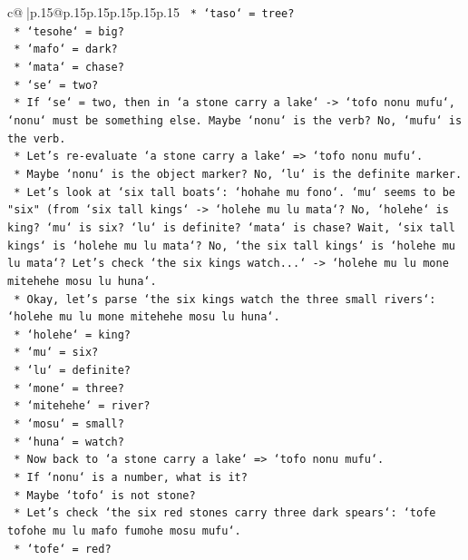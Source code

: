 \documentclass{article}
\begin{document}
{\begin{supertabular}{c@{$\;$}|p{.15\linewidth}@{}p{.15\linewidth}p{.15\linewidth}p{.15\linewidth}p{.15\linewidth}p{.15\linewidth}}
{{{\texttt{        *   `taso` = tree?} \\
\texttt{        *   `tesohe` = big?} \\
\texttt{        *   `mafo` = dark?} \\
\texttt{        *   `mata` = chase?} \\
\texttt{        *   `se` = two?} \\
\texttt{        *   If `se` = two, then in `a stone carry a lake` {-}> `tofo nonu mufu`, `nonu` must be something else. Maybe `nonu` is the verb? No, `mufu` is the verb.} \\
\texttt{        *   Let's re{-}evaluate `a stone carry a lake` => `tofo nonu mufu`.} \\
\texttt{        *   Maybe `nonu` is the object marker? No, `lu` is the definite marker.} \\
\texttt{        *   Let's look at `six tall boats`: `hohahe mu fono`. `mu` seems to be "six" (from `six tall kings` {-}> `holehe mu lu mata`? No, `holehe` is king? `mu` is six? `lu` is definite? `mata` is chase? Wait, `six tall kings` is `holehe mu lu mata`? No, `the six tall kings` is `holehe mu lu mata`? Let's check `the six kings watch...` {-}> `holehe mu lu mone mitehehe mosu lu huna`.} \\
\texttt{        *   Okay, let's parse `the six kings watch the three small rivers`: `holehe mu lu mone mitehehe mosu lu huna`.} \\
\texttt{            *   `holehe` = king?} \\
\texttt{            *   `mu` = six?} \\
\texttt{            *   `lu` = definite?} \\
\texttt{            *   `mone` = three?} \\
\texttt{            *   `mitehehe` = river?} \\
\texttt{            *   `mosu` = small?} \\
\texttt{            *   `huna` = watch?} \\
\texttt{        *   Now back to `a stone carry a lake` => `tofo nonu mufu`.} \\
\texttt{            *   If `nonu` is a number, what is it?} \\
\texttt{            *   Maybe `tofo` is not stone?} \\
\texttt{            *   Let's check `the six red stones carry three dark spears`: `tofe tofohe mu lu mafo fumohe mosu mufu`.} \\
\texttt{                *   `tofe` = red?} \\
}}}
\end{supertabular}}
\end{document}
